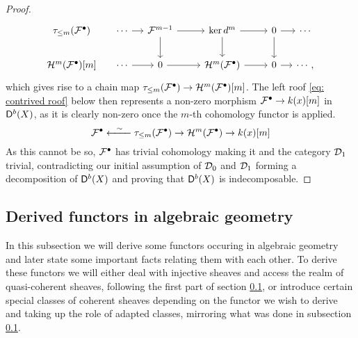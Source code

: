 \begin{proof}
\[\begin{tikzcd}[row sep = small, column sep = small]
        {\rtruncation{m}(\mathcal F^\bullet)} & \cdots & {\mathcal F^{m-1}} && {\ker d^m} && 0 & \cdots \\
        \\
        {\mathcal H^m(\mathcal F^\bullet)[m]} & \cdots & 0 && {\mathcal H^m(\mathcal F^\bullet)} && 0 & \cdots,
        \arrow[from=1-2, to=1-3]
        \arrow[from=1-3, to=1-5]
        \arrow[from=1-3, to=3-3]
        \arrow[from=1-5, to=1-7]
        \arrow[from=1-5, to=3-5]
        \arrow[from=1-7, to=1-8]
        \arrow[from=1-7, to=3-7]
        \arrow[from=3-2, to=3-3]
        \arrow[from=3-3, to=3-5]
        \arrow[from=3-5, to=3-7]
        \arrow[from=3-7, to=3-8]
    \end{tikzcd}\]
    which gives rise to a chain map $\tau_{\leq m}(\mathcal F^\bullet) \to \mathcal H^m(\mathcal F^\bullet)[m]$. The left roof \eqref{eq: contrived roof} below then represents a non-zero morphism $\mathcal F^\bullet \to k(x)[m]$ in $\mathsf{D}^b(X)$, as it is clearly non-zero once the $m$-th cohomology functor is applied.
    \begin{equation}
        \label{eq: contrived roof}
        \mathcal F^\bullet \xleftarrow{\ \ \sim \ \ } \tau_{\leq m}(\mathcal F^\bullet) \to \mathcal H^m(\mathcal F^\bullet) \to k(x)[m]
    \end{equation}
    As this cannot be so, $\mathcal F^\bullet$ has trivial cohomology making it and the category $\mathcal D_1$ trivial, contradicting our initial assumption of $\mathcal D_0$ and $\mathcal D_1$ forming a decomposition of $\mathsf{D}^b(X)$ and proving that $\mathsf{D}^b(X)$ is indecomposable. 
\end{proof}


\newpage

\subsection{Derived functors in algebraic geometry}

In this subsection we will derive some functors occuring in algebraic geometry and later state some important facts relating them with each other. To derive these functors we will either deal with injective sheaves and access the realm of quasi-coherent sheaves, following the first part of section \ref{}, or introduce certain special classes of coherent sheaves depending on the functor we wish to derive and taking up the role of adapted classes, mirroring what was done in subsection \ref{}.


